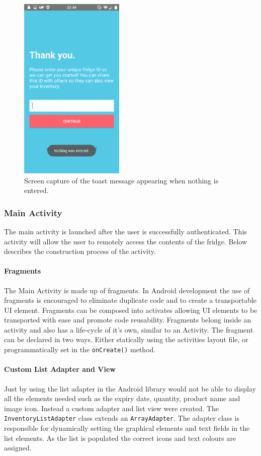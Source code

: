 \documentclass[a4paper, 11pt]{article}
\begin{document}
\begin{figure}[!htbp]
\centering
\includegraphics[width=5cm]{toast}
\caption{Screen capture of the toast message appearing when nothing is entered.} \label{fig:toast}
\end{figure}

\vspace{\baselineskip}

\subsubsection{Main Activity}
The main activity is launched after the user is successfully authenticated. This activity will allow the user to remotely access the contents of the fridge. Below describes the construction process of the activity. 

\paragraph{Fragments} The Main Activity is made up of fragments. In Android development the use of fragments is encouraged to eliminate duplicate code and to create a transportable UI element. Fragments can be composed into activates allowing UI elements to be transported with ease and promote code reusability. Fragments belong inside an activity and also has a life-cycle of it's own, similar to an Activity. The fragment can be declared in two ways. Either statically using the activities layout file, or programmatically set in the \texttt{onCreate()} method.  	

\paragraph{Custom List Adapter and View} 
Just by using the list adapter in the Android library would not be able to display all the elements needed such as the expiry date, quantity, product name and image icon. Instead a custom adapter and list view were created. The \texttt{InventoryListAdapter} class extends an \texttt{ArrayAdapter}. The adapter class is responsible for dynamically setting the graphical elements and text fields in the list elements. As the list is populated the correct icons and text colours are assigned.
\end{document}
